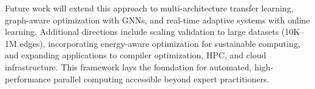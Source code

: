 Future work will extend this approach to multi-architecture transfer learning, graph-aware optimization with GNNs, and real-time adaptive systems with online learning. Additional directions include scaling validation to large datasets (10K–1M edges), incorporating energy-aware optimization for sustainable computing, and expanding applications to compiler optimization, HPC, and cloud infrastructure. This framework lays the foundation for automated, high-performance parallel computing accessible beyond expert practitioners.